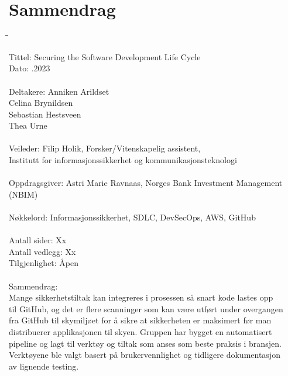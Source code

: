 \newpage
\chapter*{Sammendrag}

\begin{tabbing}
\hspace{2cm}\=\hspace{3cm}\=\kill %

Tittel: \> \> Securing the Software Development Life Cycle \\
Dato: \> .2023 \\ 
\\
Deltakere: \> \> Anniken Arildset \\ \> \> Celina Brynildsen \\ \> \> Sebastian Hestsveen \\ \> \> Thea Urne \\
\\
Veileder: \> \> Filip Holik, Forsker/Vitenskapelig assistent, \\\> \> Institutt for informasjonssikkerhet og kommunikasjonsteknologi \\
\\
Oppdragsgiver: \> \>  Astri Marie Ravnaas, Norges Bank Investment Management (NBIM) \\
\\
Nøkkelord: \> \> Informasjonssikkerhet, SDLC, DevSecOps, AWS, GitHub \\
\\
Antall sider: \> \> Xx \\
Antall vedlegg: \> \> Xx \\
Tilgjenlighet: \> \> Åpen \\
\\
Sammendrag: \\\> \>Mange sikkerhetstiltak kan integreres i prosessen så snart kode lastes opp\\\> \> til GitHub, og det er flere scanninger som kan være utført under overgangen\\\> \> fra GitHub til skymiljøet for å sikre at sikkerheten er maksimert før man\\\> \> distribuerer applikasjonen til skyen. Gruppen har bygget en automatisert\\\> \> pipeline og lagt til verktøy og tiltak som anses som beste praksis i bransjen.\\\> \> Verktøyene ble valgt basert på brukervennlighet og tidligere dokumentasjon\\\> \> av lignende testing.

\end{tabbing}


